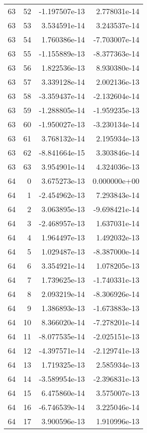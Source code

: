 \begin{tabular}{rrrr}
  63 &   52 & -1.197507e-13 &  2.778031e-14 \\
  63 &   53 &  3.534591e-14 &  3.243537e-14 \\
  63 &   54 &  1.760386e-14 & -7.703007e-14 \\
  63 &   55 & -1.155889e-13 & -8.377363e-14 \\
  63 &   56 &  1.822536e-13 &  8.930380e-14 \\
  63 &   57 &  3.339128e-14 &  2.002136e-13 \\
  63 &   58 & -3.359437e-14 & -2.132604e-14 \\
  63 &   59 & -1.288805e-14 & -1.959235e-13 \\
  63 &   60 & -1.950027e-13 & -3.230134e-14 \\
  63 &   61 &  3.768132e-14 &  2.195934e-13 \\
  63 &   62 & -8.841664e-15 &  3.303846e-14 \\
  63 &   63 &  3.954901e-14 &  4.324036e-13 \\
  64 &    0 &  3.675273e-13 &  0.000000e+00 \\
  64 &    1 & -2.454962e-13 &  7.293843e-14 \\
  64 &    2 &  3.063895e-13 & -9.698421e-14 \\
  64 &    3 & -2.468957e-13 &  1.637031e-14 \\
  64 &    4 &  1.964497e-13 &  1.492032e-13 \\
  64 &    5 &  1.029487e-13 & -8.387000e-14 \\
  64 &    6 &  3.354921e-14 &  1.078205e-13 \\
  64 &    7 &  1.739625e-13 & -1.740331e-13 \\
  64 &    8 &  2.093219e-14 & -8.306926e-14 \\
  64 &    9 &  1.386893e-13 & -1.673883e-13 \\
  64 &   10 &  8.366020e-14 & -7.278201e-14 \\
  64 &   11 & -8.077535e-14 & -2.025151e-13 \\
  64 &   12 & -4.397571e-14 & -2.129741e-13 \\
  64 &   13 &  1.719325e-13 &  2.585934e-13 \\
  64 &   14 & -3.589954e-13 & -2.396831e-13 \\
  64 &   15 &  6.475860e-14 &  3.575007e-13 \\
  64 &   16 & -6.746539e-14 &  3.225046e-14 \\
  64 &   17 &  3.900596e-13 &  1.910996e-13 \\

\end{tabular}
